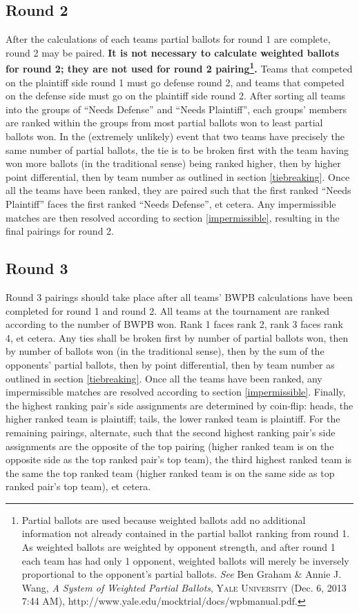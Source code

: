 \documentclass{article}
\begin{document}
\subsection{Round 2}
After the calculations of each teams partial ballots for round 1 are complete, round 2 may be paired.  \textbf{It is not necessary to calculate weighted ballots for round 2; they are not used for round 2 pairing\footnote{Partial ballots are used because weighted ballots add no additional information not already contained in the partial ballot ranking from round 1.  As weighted ballots are weighted by opponent strength, and after round 1 each team has had only 1 opponent, weighted ballots will merely be inversely proportional to the opponent's partial ballots.  \textit{See} Ben Graham \& Annie J. Wang, \textit{A System of Weighted Partial Ballots}, \textsc{Yale University} (Dec. 6, 2013 7:44 AM), http://www.yale.edu/mocktrial/docs/wpbmanual.pdf.}.}  Teams that competed on the plaintiff side round 1 must go defense round 2, and teams that competed on the defense side must go on the plaintiff side round 2.  After sorting all teams into the groups of ``Needs Defense'' and ``Needs Plaintiff'', each groups' members are ranked within the groups from most partial ballots won to least partial ballots won.  In the (extremely unlikely) event that two teams have precisely the same number of partial ballots, the tie is to be broken first with the team having won more ballots (in the traditional sense) being ranked higher, then by higher point differential, then by team number as outlined in section \ref{tiebreaking}.  Once all the teams have been ranked, they are paired such that the first ranked ``Needs Plaintiff'' faces the first ranked ``Needs Defense'', et cetera.  Any impermissible matches are then resolved according to section \ref{impermissible}, resulting in the final pairings for round 2.
\subsection{Round 3}
Round 3 pairings should take place after all teams' BWPB calculations have been completed for round 1 and round 2.  All teams at the tournament are ranked according to the number of BWPB won.  Rank 1 faces rank 2, rank 3 faces rank 4, et cetera.  Any ties shall be broken first by number of partial ballots won, then by number of ballots won (in the traditional sense), then by the sum of the opponents' partial ballots, then by point differential, then by team number as outlined in section \ref{tiebreaking}.  Once all the teams have been ranked, any impermissible matches are resolved according to section \ref{impermissible}. Finally, the highest ranking pair's side assignments are determined by coin-flip: heads, the higher ranked team is plaintiff; tails, the lower ranked team is plaintiff. For the remaining pairings, alternate, such that the second highest ranking pair's side assignments are the opposite of the top pairing (higher ranked team is on the opposite side as the top ranked pair's top team), the third highest ranked team is the same the top ranked team (higher ranked team is on the same side as top ranked pair's top team), et cetera.
\end{document}
